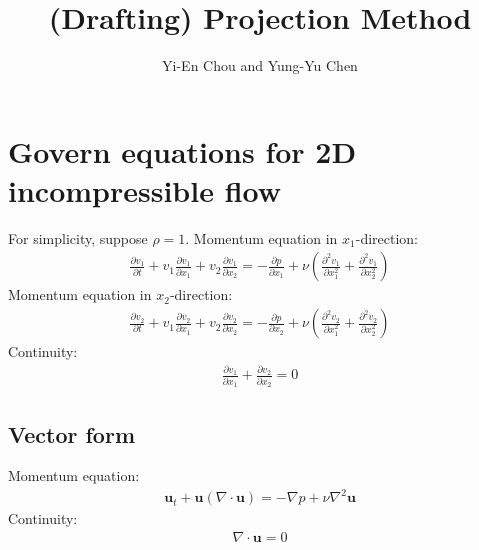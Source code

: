 \documentclass[11pt,dvips]{article}
\title{
%
(Drafting) Projection Method
%
}
\author{
%
Yi-En Chou and Yung-Yu Chen
%
}
\numberwithin{equation}{section}
\begin{document}
\maketitle

\begin{abstract}
%
%
\end{abstract}


\section{Govern equations for 2D incompressible flow}
%
\label{s:projection}

For simplicity, suppose $\rho=1$.
Momentum equation in $x_1$-direction:
%
\begin{align}
\frac{\partial v_1}{\partial t}+v_1 \frac{\partial v_1}{\partial x_1}+v_2 \frac{\partial v_1}
{\partial x_2}=-\frac{\partial p}{\partial x_1}+ \nu (\frac{\partial^2 v_1}{\partial x_1^2}
+\frac{\partial^2 v_1}{\partial x_2^2}) \label{e:x_1_momentum}
\end{align}
%
Momentum equation in $x_2$-direction:
%
\begin{align}
\frac{\partial v_2}{\partial t}+v_1 \frac{\partial v_2}{\partial x_1}+v_2 \frac{\partial v_2}
{\partial x_2}=-\frac{\partial p}{\partial x_2}+ \nu (\frac{\partial^2 v_2}{\partial x_1^2}
+\frac{\partial^2 v_2}{\partial x_2^2}) \label{e:x_2_momentum}
\end{align}
%
Continuity:  
%
\begin{align}
\frac{\partial v_1}{\partial x_1}+\frac{\partial v_2}{\partial x_2}=0 \label{e:continuity}
\end{align}
%
\subsection{Vector form}
Momentum equation:
%
\begin{align}
\mathbf{u}_t+\mathbf{u}(\nabla \cdot \mathbf{u})=-\nabla p+\nu \nabla^2 \mathbf{u} 
\label{e:momentum_vec}
\end{align}
%
Continuity:
%
\begin{align}
\nabla \cdot \mathbf{u}=0 \label{e:continuity_vec}
\end{align}
%
\end{document}
